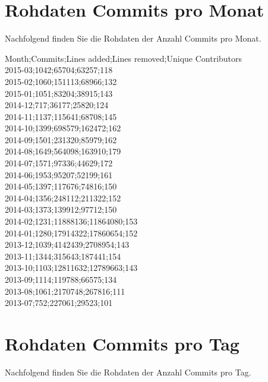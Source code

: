 \section*{Rohdaten Commits pro Monat}

Nachfolgend finden Sie die Rohdaten der Anzahl Commits pro Monat.

\noindent
Month;Commits;Lines added;Lines removed;Unique Contributors \\
2015-03;1042;65704;63257;118 \\
2015-02;1060;151113;68966;132 \\
2015-01;1051;83204;38915;143 \\
2014-12;717;36177;25820;124 \\
2014-11;1137;115641;68708;145 \\
2014-10;1399;698579;162472;162 \\
2014-09;1501;231320;85979;162 \\
2014-08;1649;564098;163910;179 \\
2014-07;1571;97336;44629;172 \\
2014-06;1953;95207;52199;161 \\
2014-05;1397;117676;74816;150 \\
2014-04;1356;248112;211322;152 \\
2014-03;1373;139912;97712;150 \\
2014-02;1231;11888136;11864080;153 \\
2014-01;1280;17914322;17860654;152 \\
2013-12;1039;4142439;2708954;143 \\
2013-11;1344;315643;187441;154 \\
2013-10;1103;12811632;12789663;143 \\
2013-09;1114;119788;66575;134 \\
2013-08;1061;2170748;267816;111 \\
2013-07;752;227061;29523;101 \\

\section*{Rohdaten Commits pro Tag}

Nachfolgend finden Sie die Rohdaten der Anzahl Commits pro Tag.

